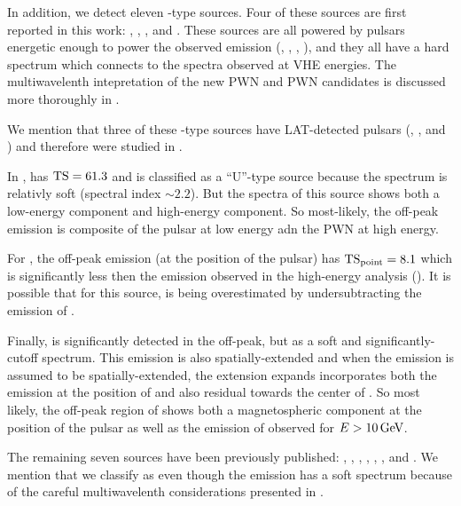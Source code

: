 In addition, we detect eleven \PWNcClass-type sources.  Four of these
sources are first reported in this work: , ,
, and .  These sources are all powered by pulsars
energetic enough to power the observed emission (, ,
, ), and they all have a hard spectrum which
connects to the spectra observed at \ac{VHE} energies.  The multiwavelenth
intepretation of the new \ac{PWN} and \ac{PWN} candidates is discussed
more thoroughly in \cite{acero_2013a_constraints-galactic}.


We mention that three of these \PWNcClass-type sources have LAT-detected
pulsars (, , and ) and therefore were
studied in .

In ,  has $\mathrm{TS}=61.3$ and is classified as a
``U''-type source because the spectrum is relativly soft (spectral index
$\sim2.2$).  But the spectra of this source shows both a low-energy
component and high-energy component.  So most-likely, the off-peak
emission is composite of the pulsar at low energy adn the \ac{PWN}
at high energy.

For , the off-peak emission (at the position of the pulsar)
has $\mathrm{TS}_\mathrm{point}=8.1$ which is significantly less then the emission observed
in the high-energy analysis ().  It is possible that for this
source, \tstev is being overestimated by undersubtracting the emission
of .

Finally,  is significantly detected in the off-peak,
but as a soft and significantly-cutoff spectrum. This emission
is also spatially-extended and when the emission is assumed to be
spatially-extended, the extension expands incorporates both the emission
at the position of  and also residual towards the center of
. So most likely, the off-peak region of  shows
both a magnetospheric component at the position of the pulsar as well
as the emission of  observed for $E>10\,\text{GeV}$.

The remaining seven sources have been previously published:
 \citep{ackermann_2011a_fermi-lat-search},
 \citep{slane_2010a_fermi-detection}, 
\citep{lande_2012_search-spatially}, 
\citep{lande_2012_search-spatially}, 
\citep{lande_2012_search-spatially}, 
\citep{tam_2010a_search-counterparts}, and 
\citep{rousseau_2012a_fermi-lat-constraints}.  We mention that we
classify  as \PWNcClass even though the \gev emission has
a soft spectrum because of the careful multiwavelenth considerations
presented in \cite{lemoine-goumard_2011a_fermi-lat-detection}.

